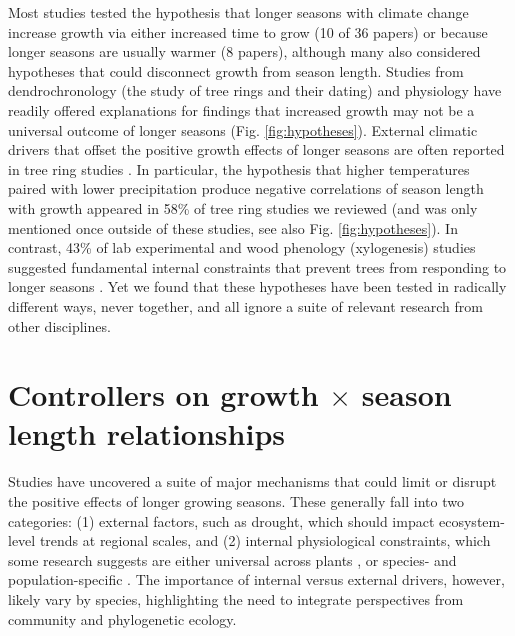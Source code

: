 \documentclass[11pt]{article}
\begin{document}
Most studies tested the hypothesis that longer seasons with climate change increase growth via either increased time to grow (10 of 36 papers) or because longer seasons are usually warmer (8 papers), although many also considered hypotheses that could disconnect growth from season length. Studies from dendrochronology (the study of tree rings and their dating) and physiology have readily offered explanations for findings that increased growth may not be a universal outcome of longer seasons (Fig. \ref{fig:hypotheses}). External climatic drivers that offset the positive growth effects of longer seasons are often reported in tree ring studies \citep{kolavr2016response,de2022temperature,camarero2022decoupled}. In particular, the hypothesis that higher temperatures paired with lower precipitation produce negative correlations of season length with growth appeared in 58\% of tree ring studies we reviewed (and was only mentioned once outside of these studies, see also Fig. \ref{fig:hypotheses}). In contrast, 43\% of lab experimental and wood phenology (xylogenesis) studies suggested fundamental internal constraints that prevent trees from responding to longer seasons \citep[Fig. \ref{fig:heatmapssupp},][]{cuny2012life,michelot2012comparing,zohner2023effect}. Yet we found that these hypotheses have been tested in radically different ways, never together, and all ignore a suite of relevant research from other disciplines. %
 
\section*{Controllers on growth $\times$ season length relationships}

Studies have uncovered a suite of major mechanisms that could limit or disrupt the positive effects of longer growing seasons. These generally fall into two categories: (1) external factors, such as drought, which should impact ecosystem-level trends at regional scales, and (2) internal physiological constraints, which some research suggests are either universal across plants \citep[e.g.][]{zohner2023effect}, or species- and population-specific \citep[e.g.][]{soolanayakanahally2013timing}. The importance of internal versus external drivers, however, likely vary by species, highlighting the need to integrate perspectives from community and phylogenetic ecology. 
\end{document}
